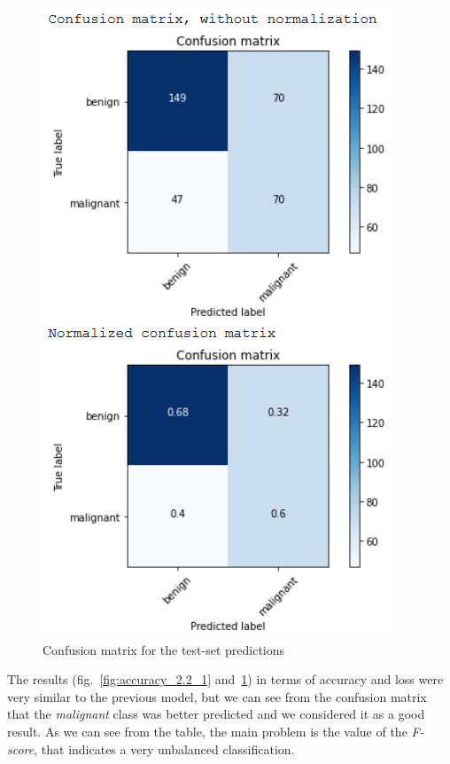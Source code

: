 \documentclass[11pt,a4paper,oneside]{article}
\begin{document}
\begin{figure}[h]
\begin{minipage}[c]{.4\textwidth}
		\includegraphics[width=.9\textwidth]{images/2.2/5_matrix}
		\caption{Confusion matrix for the test-set predictions}
		\label{fig:matrix_2.2_1}
	\end{minipage}%
\end{figure}

The results (fig.~\ref{fig:accuracy_2.2_1} and~\ref{fig:matrix_2.2_1}) in terms of accuracy and loss were very similar to the previous model, but we can see from the confusion matrix that the \textit{malignant} class was better predicted and we considered it as a good result.
As we can see from the table, the main problem is the value of the \textit{F-score}, that indicates a very unbalanced classification.\\
\end{document}
